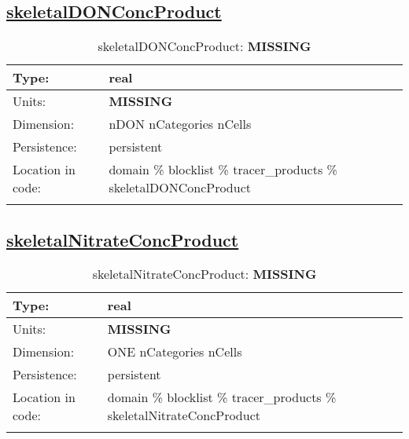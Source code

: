 \subsection[skeletalDONConcProduct]{\hyperref[sec:var_tab_tracer_products]{skeletalDONConcProduct}}
\label{subsec:var_sec_tracer_products_skeletalDONConcProduct}
\begin{center}
\begin{longtable}{| p{2.0in} | p{4.0in} |}
        \hline 
        Type: & real \\
        \hline 
        Units: & {\bf \color{red} MISSING} \\
        \hline 
        Dimension: & nDON nCategories nCells \\
        \hline 
        Persistence: & persistent \\
        \hline 
         Location in code: & domain \% blocklist \% tracer\_products \% skeletalDONConcProduct \\
         \hline 
    \caption{skeletalDONConcProduct: {\bf \color{red} MISSING}}
\end{longtable}
\end{center}
\subsection[skeletalNitrateConcProduct]{\hyperref[sec:var_tab_tracer_products]{skeletalNitrateConcProduct}}
\label{subsec:var_sec_tracer_products_skeletalNitrateConcProduct}
\begin{center}
\begin{longtable}{| p{2.0in} | p{4.0in} |}
        \hline 
        Type: & real \\
        \hline 
        Units: & {\bf \color{red} MISSING} \\
        \hline 
        Dimension: & ONE nCategories nCells \\
        \hline 
        Persistence: & persistent \\
        \hline 
         Location in code: & domain \% blocklist \% tracer\_products \% skeletalNitrateConcProduct \\
         \hline 
    \caption{skeletalNitrateConcProduct: {\bf \color{red} MISSING}}
\end{longtable}
\end{center}
